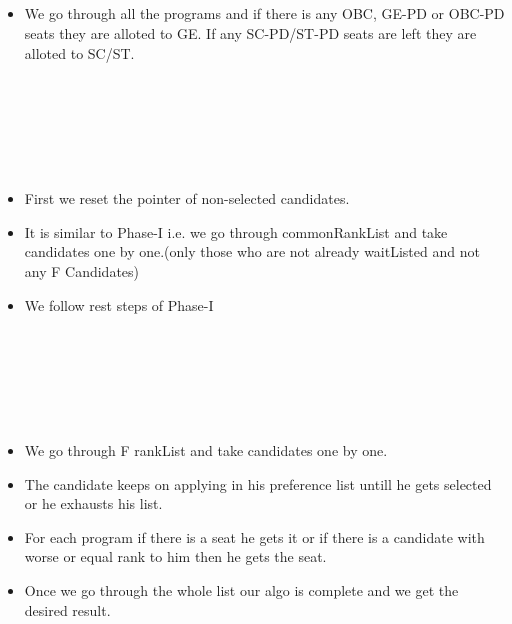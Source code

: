 \documentclass{article}
\begin{document}
\hspace*{5 mm} \\
\hspace*{5 mm} \\
\hspace*{5 mm} \\
\hspace*{5 mm}{\LARGE Now de-reservation takes place:}
\hspace*{5 mm} \\
\begin{itemize}
  \item We go through all the programs and if there is any OBC, GE-PD or OBC-PD seats they are alloted to GE. If any SC-PD/ST-PD seats are left they are alloted to SC/ST.
\end{itemize}
\hspace*{5 mm} \\
\hspace*{5 mm} \\
\hspace*{5 mm} \\
\hspace*{5 mm} \\
\hspace*{5 mm}{\LARGE Now Phase-II allocation takes place:}
\hspace*{5 mm} \\
\begin{itemize}
  \item First we reset the pointer of non-selected candidates.
  \item It is similar to Phase-I i.e. we go through commonRankList and take candidates one by one.(only those who are not already waitListed and not any F Candidates) 
  \item We follow rest steps of Phase-I
\end{itemize}
\hspace*{5 mm} \\
\hspace*{5 mm} \\
\hspace*{5 mm} \\
\hspace*{5 mm} \\
\hspace*{5 mm}{\LARGE Now F allocation takes place:}
\hspace*{5 mm} \\
\begin{itemize}
  \item We go through F rankList and take candidates one by one. 
  \item The candidate keeps on applying in his preference list untill he gets selected or he exhausts his list.
  \item For each program if there is a seat he gets it or if there is a candidate with worse or equal rank to him then he gets the seat.
  \item Once we go through the whole list our algo is complete and we get the desired result.
\end{itemize}
\pagebreak
\end{document}
